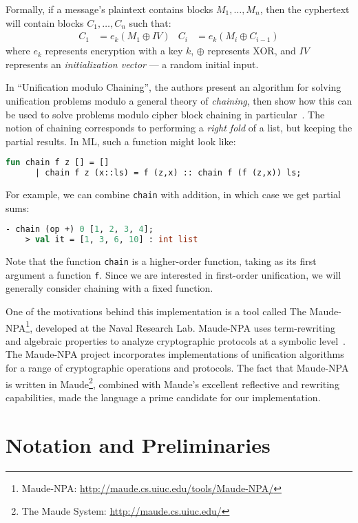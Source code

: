 \documentclass[11pt]{article}
\begin{document}
Formally, if a message's plaintext contains blocks $M_1, \dotsc, M_n$, then
the cyphertext will contain blocks $C_1, \dotsc, C_n$ such that:
\begin{align*}
    C_1 &= e_k(M_1 \oplus IV) &
    C_i &= e_k(M_i \oplus C_{i-1})
\end{align*}
where $e_k$ represents encryption with a key $k$, $\oplus$ represents XOR, and
$IV$ represents an \emph{initialization vector} --- a random initial input.

In ``Unification modulo Chaining'', the authors present an algorithm for
solving unification problems modulo a general theory of \emph{chaining}, then
show how this can be used to solve problems modulo cipher block chaining in
particular~\cite{anantharaman2012unification}. The notion of chaining
corresponds to performing a \emph{right fold} of a list, but keeping the
partial results.  In ML, such a function might look like:
\begin{lstlisting}[language=ML, style=smalllisting]
    fun chain f z [] = []
      | chain f z (x::ls) = f (z,x) :: chain f (f (z,x)) ls;
\end{lstlisting}
For example, we can combine \lstinline|chain| with addition, in which case we
get partial sums:
\begin{lstlisting}[language=ML, style=smalllisting]
    - chain (op +) 0 [1, 2, 3, 4];
    > val it = [1, 3, 6, 10] : int list
\end{lstlisting}
Note that the function \lstinline|chain| is a higher-order function, taking as
its first argument a function \lstinline|f|. Since we are interested in
first-order unification, we will generally consider chaining with a fixed
function.

One of the motivations behind this implementation is a tool called The
Maude-NPA\footnote{Maude-NPA: \url{http://maude.cs.uiuc.edu/tools/Maude-NPA/}},
developed at the Naval Research Lab. Maude-NPA uses term-rewriting and
algebraic properties to analyze cryptographic protocols at a symbolic
level~\cite{escobar2009maude}.  The Maude-NPA project incorporates
implementations of unification algorithms for a range of cryptographic
operations and protocols. The fact that Maude-NPA is written in
Maude\footnote{The Maude System: \url{http://maude.cs.uiuc.edu/}}, combined
with Maude's excellent reflective and rewriting capabilities, made the language
a prime candidate for our implementation.

\section{Notation and Preliminaries}\label{section:notation}
\end{document}
